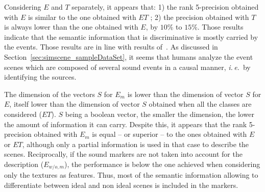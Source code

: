 \documentclass[12pt]{elsarticle}
\newcommand{\ie}{\emph{i.\,e.}}
\begin{document}
Considering $E$ and $T$ separately, it appears that: 1) the rank 5-precision obtained with $E$ is similar to the one obtained with $ET$ ; 2) the precision obtained with $T$ is always lower than the one obtained with $E$, by $10\%$ to $15\%$. Those results indicate that the semantic information that is discriminative is mostly carried by the events. Those results are in line with results of~\cite{maffiolo_caracterisation_1999}. As discussed in Section~\ref{sec:simscene_sampleDataSet}, it seems that humans analyze the event scenes which are composed of several sound events in a causal manner, \ie~by identifying the sources.


The dimension of the vectors $S$ for $E_m$ is lower than the dimension of vector $S$ for $E$, itself lower than the dimension of vector $S$ obtained when all the classes are considered ($ET$). $S$ being a boolean vector, the smaller the dimension, the lower the amount of information it can carry. Despite this, it appears that the rank 5-precision obtained with $E_m$ is equal – or superior – to the ones obtained with $E$ or $ET$, although only a partial information is used in that case to describe the scenes. Reciprocally, if the sound markers are not taken into account for the description ($E_{w/o,m}$), the performance is below the one achieved when considering only the textures as features. Thus, most of the semantic information allowing to differentiate between ideal and non ideal scenes is included in the markers.

%
\end{document}
